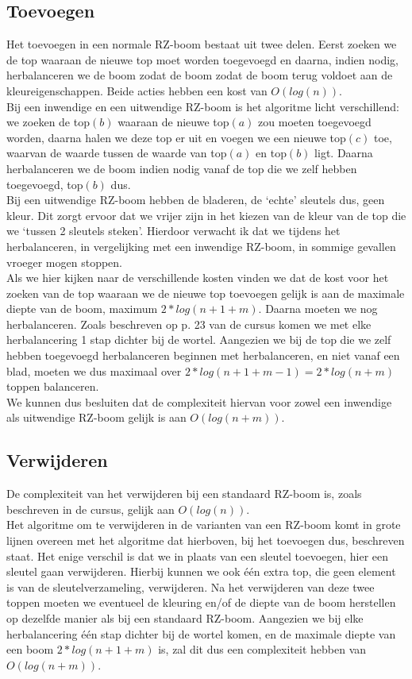 \documentclass[11pt,a4paper]{report}
\begin{document}
\subsection*{Toevoegen}
Het toevoegen in een normale RZ-boom bestaat uit twee delen. Eerst zoeken we de top waaraan de nieuwe top moet worden toegevoegd en daarna, indien nodig, herbalanceren we de boom zodat de boom zodat de boom terug voldoet aan de kleureigenschappen. Beide acties hebben een kost van $O(log(n))$.\\
Bij een inwendige en een uitwendige RZ-boom is het algoritme licht verschillend: we zoeken de top$(b)$ waaraan de nieuwe top$(a)$ zou moeten toegevoegd worden, daarna halen we deze top er uit en voegen we een nieuwe top$(c)$ toe, waarvan de waarde tussen de waarde van top$(a)$ en top$(b)$ ligt. Daarna herbalanceren we de boom indien nodig vanaf de top die we zelf hebben toegevoegd, top$(b)$ dus.\\
Bij een uitwendige RZ-boom hebben de bladeren, de `echte' sleutels dus, geen kleur. Dit zorgt ervoor dat we vrijer zijn in het kiezen van de kleur van de top die we `tussen 2 sleutels steken'. Hierdoor verwacht ik dat we tijdens het herbalanceren, in vergelijking met een inwendige RZ-boom, in sommige gevallen vroeger mogen stoppen.\\
Als we hier kijken naar de verschillende kosten vinden we dat de kost voor het zoeken van de top waaraan we de nieuwe top toevoegen gelijk is aan de maximale diepte van de boom, maximum $2*log(n+1+m)$. Daarna moeten we nog herbalanceren. Zoals beschreven op p. 23 van de cursus komen we met elke herbalancering 1 stap dichter bij de wortel. Aangezien we bij de top die we zelf hebben toegevoegd herbalanceren beginnen met herbalanceren, en niet vanaf een blad, moeten we dus maximaal over $2*log(n+1+m-1) = 2*log(n+m)$ toppen balanceren. \\
We kunnen dus besluiten dat de complexiteit hiervan voor zowel een inwendige als uitwendige RZ-boom gelijk is aan $O(log(n+m))$.

\subsection*{Verwijderen}
De complexiteit van het verwijderen bij een standaard RZ-boom is, zoals beschreven in de cursus, gelijk aan $O(log(n))$.\\
Het algoritme om te verwijderen in de varianten van een RZ-boom komt in grote lijnen overeen met het algoritme dat hierboven, bij het toevoegen dus, beschreven staat. Het enige verschil is dat we in plaats van een sleutel toevoegen, hier een sleutel gaan verwijderen. Hierbij kunnen we ook \'e\'en extra top, die geen element is van de sleutelverzameling, verwijderen. Na het verwijderen van deze twee toppen moeten we eventueel de kleuring en/of de diepte van de boom herstellen op dezelfde manier als bij een standaard RZ-boom. Aangezien we bij elke herbalancering \'e\'en stap dichter bij de wortel komen, en de maximale diepte van een boom $2*log(n+1+m)$ is, zal dit dus een complexiteit hebben van $O(log(n+m))$.\\
\end{document}
